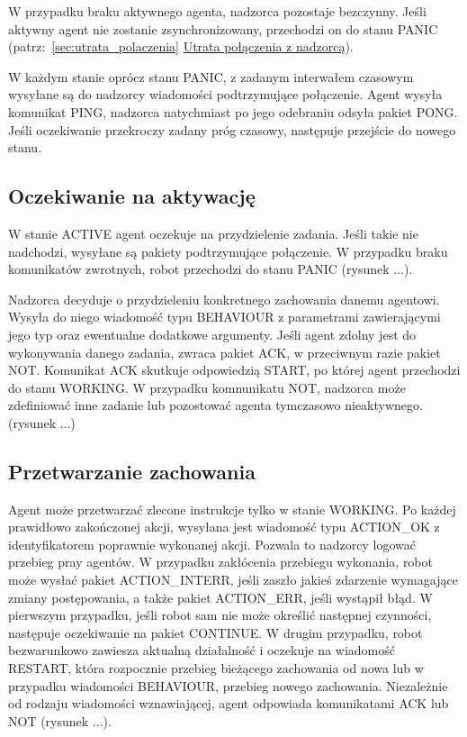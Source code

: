 
W przypadku braku aktywnego agenta, nadzorca pozostaje bezczynny. Jeśli aktywny agent nie zostanie zsynchronizowany, przechodzi on do stanu PANIC (patrz:~\ref{sec:utrata_polaczenia} \hyperref[sec:utrata_polaczenia]{Utrata połączenia z nadzorcą}).

W każdym stanie oprócz stanu PANIC, z zadanym interwałem czasowym wysyłane są do nadzorcy wiadomości podtrzymujące połączenie. Agent wysyła komunikat PING, nadzorca natychmiast po jego odebraniu odsyła pakiet PONG. Jeśli oczekiwanie przekroczy zadany próg czasowy, następuje przejście do nowego stanu.

\subsection{Oczekiwanie na aktywację}

W stanie ACTIVE agent oczekuje na przydzielenie zadania. Jeśli takie nie nadchodzi, wysyłane są pakiety podtrzymujące połączenie. W przypadku braku komunikatów zwrotnych, robot przechodzi do stanu PANIC (rysunek ...).


Nadzorca decyduje o przydzieleniu konkretnego zachowania danemu agentowi. Wysyła do niego wiadomość typu BEHAVIOUR z parametrami zawierającymi jego typ oraz ewentualne dodatkowe argumenty. Jeśli agent zdolny jest do wykonywania danego zadania, zwraca pakiet ACK, w przeciwnym razie pakiet NOT. Komunikat ACK skutkuje odpowiedzią START, po której agent przechodzi do stanu WORKING. W przypadku komnunikatu NOT, nadzorca może zdefiniować inne zadanie lub pozostować agenta tymczasowo nieaktywnego. (rysunek ...)


\subsection{Przetwarzanie zachowania}

Agent może przetwarzać zlecone instrukcje tylko w stanie WORKING. Po każdej prawidłowo zakończonej akcji, wysyłana jest wiadomość typu ACTION\_OK z identyfikatorem poprawnie wykonanej akcji. Pozwala to nadzorcy logować przebieg pray agentów. W przypadku zakłócenia przebiegu wykonania, robot może wysłać pakiet ACTION\_INTERR, jeśli zaszło jakieś zdarzenie wymagające zmiany postępowania, a także pakiet ACTION\_ERR, jeśli wystąpił błąd. W pierwszym przypadku, jeśli robot sam nie może określić następnej czynności, następuje oczekiwanie na pakiet CONTINUE. W drugim przypadku, robot bezwarunkowo zawiesza aktualną działalność i oczekuje na wiadomość RESTART, która rozpocznie przebieg bieżącego zachowania od nowa lub w przypadku wiadomości BEHAVIOUR, przebieg nowego zachowania. Niezależnie od rodzaju wiadomości wznawiającej, agent odpowiada komunikatami ACK lub NOT (rysunek ...).

